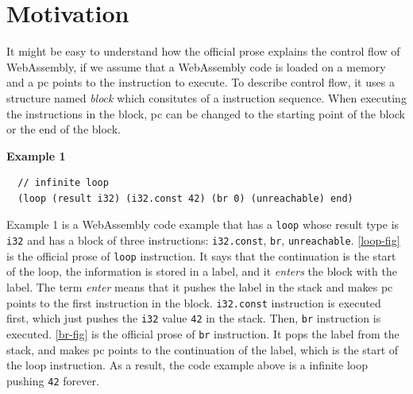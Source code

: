 
\chapter{Motivation}
\label{ch:motivation}
\noindent

\newcommand{\officialp}{official prose}
\newcommand{\spectecp}{SpecTec prose}


It might be easy to understand how the \officialp{} explains the control flow
of WebAssembly, if we assume that a WebAssembly code is loaded on a memory and
a pc points to the instruction to execute.
To describe control flow, it uses a structure named \textit{block} which
consitutes of a instruction sequence.
When executing the instructions in the block, pc can be changed to the starting
point of the block or the end of the block.

\textbf{Example 1}
\begin{verbatim}
  // infinite loop
  (loop (result i32) (i32.const 42) (br 0) (unreachable) end)
\end{verbatim}

Example 1 is a WebAssembly code example that has a \texttt{loop} whose result
type is \texttt{i32} and has a block of three instructions: \texttt{i32.const},
\texttt{br}, \texttt{unreachable}.
\cref{loop-fig} is the \officialp{} of \texttt{loop} instruction.
It says that the continuation is the start of the loop, the information is
stored in a label, and it \textit{enters} the block with the label.
The term \textit{enter} means that it pushes the label in the stack and makes
pc points to the first instruction in the block.
\texttt{i32.const} instruction is executed first, which just pushes the
\texttt{i32} value \texttt{42} in the stack.
Then, \texttt{br} instruction is executed.
\cref{br-fig} is the \officialp{} of \texttt{br} instruction.
It pops the label from the stack, and makes pc points to the continuation of
the label, which is the start of the loop instruction.
As a result, the code example above is a infinite loop pushing \texttt{42}
forever.

